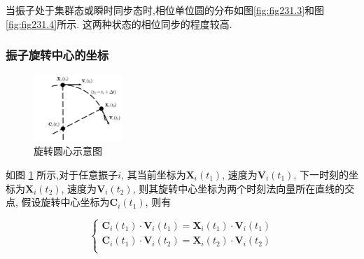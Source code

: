 \documentclass{article}
\begin{document}
当振子处于集群态或瞬时同步态时,相位单位圆的分布如图\ref{fig:fig231.3}和图\ref{fig:fig231.4}所示. 这两种状态的相位同步的程度较高.

\newpage
\subsubsection{振子旋转中心的坐标}

\begin{figure}[H]
	\centering
	\includegraphics[width=0.3\textwidth]{./figs/CenterEps.pdf}
	\vspace{-0.2cm}
	\caption{旋转圆心示意图}
	\label{fig:fig232.1}
\end{figure}

如图 \ref{fig:fig232.1} 所示,对于任意振子$i$, 其当前坐标为$\mathbf{X}_i\left( t_1 \right)$, 速度为$\mathbf{V}_i\left( t_1 \right)$, 下一时刻的坐标为$\mathbf{X}_i\left( t_2 \right)$, 速度为$\mathbf{V}_i\left( t_2 \right)$, 则其旋转中心坐标为两个时刻法向量所在直线的交点, 假设旋转中心坐标为$\mathbf{C}_i\left( t_1 \right)$, 则有

\vspace{-0.5cm}

$$
\begin{cases}
	\mathbf{C}_i\left( t_1 \right) \cdot \mathbf{V}_i\left( t_1 \right) =\mathbf{X}_i\left( t_1 \right) \cdot \mathbf{V}_i\left( t_1 \right) \\
	\mathbf{C}_i\left( t_1 \right) \cdot \mathbf{V}_i\left( t_2 \right) =\mathbf{X}_i\left( t_2 \right) \cdot \mathbf{V}_i\left( t_2 \right) \\
\end{cases}
$$


\end{document}
